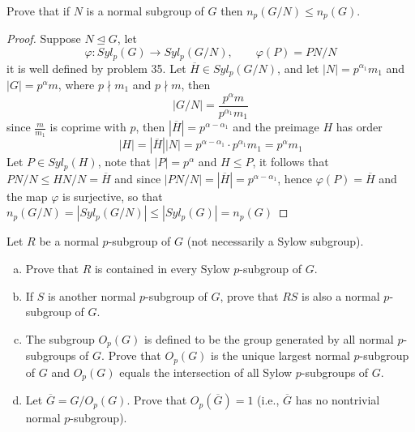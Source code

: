 \documentclass{article}
\newenvironment{problem}[2][Problem]{\begin{trivlist}
\item[\hskip \labelsep {\bfseries #1}\hskip \labelsep {\bfseries #2.}]}{\end{trivlist}}
\begin{document}
\begin{problem}{36}
    Prove that if $N$ is a normal subgroup of $G$ then $n_p(G/N) \leq n_p(G)$.
\end{problem}
\begin{proof}
    Suppose $N\trianglelefteq G$, let 
    \[
        \varphi: Syl_p(G) \rightarrow Syl_p(G/N), \qquad \varphi(P)=PN/N
    \]
    it is well defined by problem 35. Let $\overline{H}\in Syl_p(G/N)$, and let $|N|=p^{\alpha_1}m_1$ and $|G|=p^{\alpha}m$, where $p\nmid m_1$ and $p\nmid m$, then 
    \[
        |G/N|=\frac{p^\alpha m}{p^{\alpha_1}m_1}
    \]
    since $\frac{m}{m_1}$ is coprime with $p$, then $|\overline{H}|=p^{\alpha-\alpha_1}$ and the preimage $H$ has order \[|H|=|\overline{H}||N|=p^{\alpha-\alpha_1}\cdot p^{\alpha_1}m_1 = p^{\alpha}m_1\] 
    Let $P\in Syl_p(H)$, note that $|P|=p^{\alpha}$ and $H\leq P$, it follows that $PN/N\leq HN/N=\overline{H}$ and since $|PN/N|=|\overline{H}|=p^{\alpha-\alpha_1}$, hence $\varphi(P)=\overline{H}$ and the map $\varphi$ is surjective, so that $n_p(G/N)=|Syl_p(G/N)|\leq |Syl_p(G)|=n_p(G)$
\end{proof}
\begin{problem}{37}
    Let $R$ be a normal $p$-subgroup of $G$ (not necessarily a Sylow subgroup).
    \begin{enumerate}[(a)]
        \item Prove that $R$ is contained in every Sylow $p$-subgroup of $G$.
        \item If $S$ is another normal $p$-subgroup of $G$, prove that $RS$ is also a normal $p$-subgroup of $G$.
        \item The subgroup $O_p(G)$ is defined to be the group generated by all normal $p$-subgroups of $G$. Prove that $O_p(G)$ is the unique largest normal $p$-subgroup of $G$ and $O_p(G)$ equals the intersection of all Sylow $p$-subgroups of $G$.
        \item Let $\overline{G} = G / O_p(G)$. Prove that $O_p(\overline{G}) = 1$ (i.e., $\overline{G}$ has no nontrivial normal $p$-subgroup).
    \end{enumerate}
\end{problem}
\end{document}
